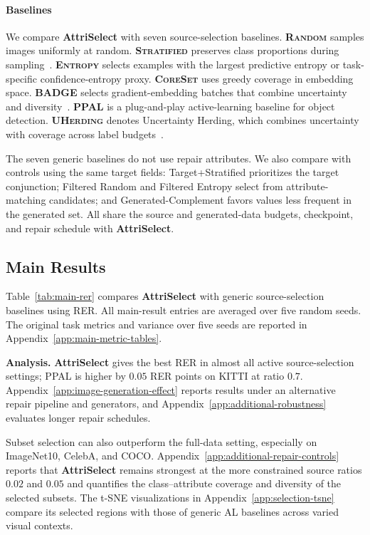\documentclass[10pt,twocolumn,letterpaper]{article}
\newcommand{\modelname}{AttriSelect}
\newcommand{\model}{\textcolor{darkteal}{\textbf{\modelname}}\xspace}
\begin{document}
\paragraph{Baselines}
We compare \model with seven source-selection baselines. \textbf{\textsc{Random}} samples images uniformly at random. \textbf{\textsc{Stratified}} preserves class proportions during sampling~\citep{neyman1934two}. \textbf{\textsc{Entropy}} selects examples with the largest predictive entropy or task-specific confidence-entropy proxy. \textbf{\textsc{CoreSet}} uses greedy coverage in embedding space. \textbf{\textsc{BADGE}} selects gradient-embedding batches that combine uncertainty and diversity~\citep{settles2009active,sener2018active,ash2020deep}. \textbf{\textsc{PPAL}} is a plug-and-play active-learning baseline for object detection. \textbf{\textsc{UHerding}} denotes Uncertainty Herding, which combines uncertainty with coverage across label budgets~\citep{yang2024ppal,bae2025uncertainty}.

The seven generic baselines do not use repair attributes. We also compare with controls using the same target fields: Target+Stratified prioritizes the target conjunction; Filtered Random and Filtered Entropy select from attribute-matching candidates; and Generated-Complement favors values less frequent in the generated set. All share the source and generated-data budgets, checkpoint, and repair schedule with \model.

\subsection{Main Results}

Table~\ref{tab:main-rer} compares \model with generic source-selection baselines using RER. All main-result entries are averaged over five random seeds. The original task metrics and variance over five seeds are reported in Appendix~\ref{app:main-metric-tables}.

\noindent\textbf{Analysis.} \model gives the best RER in almost all active source-selection settings; PPAL is higher by $0.05$ RER points on KITTI at ratio $0.7$. Appendix~\ref{app:image-generation-effect} reports results under an alternative repair pipeline and generators, and Appendix~\ref{app:additional-robustness} evaluates longer repair schedules.

Subset selection can also outperform the full-data setting, especially on ImageNet10, CelebA, and COCO. Appendix~\ref{app:additional-repair-controls} reports that \model remains strongest at the more constrained source ratios $0.02$ and $0.05$ and quantifies the class--attribute coverage and diversity of the selected subsets. The t-SNE visualizations in Appendix~\ref{app:selection-tsne} compare its selected regions with those of generic AL baselines across varied visual contexts.
\end{document}
